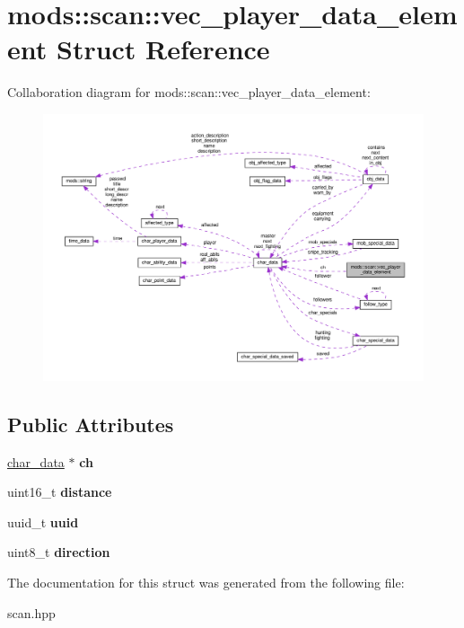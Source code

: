 \hypertarget{structmods_1_1scan_1_1vec__player__data__element}{}\section{mods\+:\+:scan\+:\+:vec\+\_\+player\+\_\+data\+\_\+element Struct Reference}
\label{structmods_1_1scan_1_1vec__player__data__element}


Collaboration diagram for mods\+:\+:scan\+:\+:vec\+\_\+player\+\_\+data\+\_\+element\+:
\nopagebreak
\begin{figure}[H]
\begin{center}
\leavevmode
\includegraphics[width=350pt]{structmods_1_1scan_1_1vec__player__data__element__coll__graph}
\end{center}
\end{figure}
\subsection*{Public Attributes}
\begin{DoxyCompactItemize}
\item 
\mbox{\label{structmods_1_1scan_1_1vec__player__data__element_a0c777572b74b2fa35af585d92483ebf6}} 
\hyperlink{structchar__data}{char\+\_\+data} $\ast$ {\bfseries ch}
\item 
\mbox{\label{structmods_1_1scan_1_1vec__player__data__element_ad17f50dc8c2fba5fe4071328826add3c}} 
uint16\+\_\+t {\bfseries distance}
\item 
\mbox{\label{structmods_1_1scan_1_1vec__player__data__element_abbb4c1a40d4298bb66ffa5271abf7cd4}} 
uuid\+\_\+t {\bfseries uuid}
\item 
\mbox{\label{structmods_1_1scan_1_1vec__player__data__element_a0fd083583c787294616cb513449a8524}} 
uint8\+\_\+t {\bfseries direction}
\end{DoxyCompactItemize}


The documentation for this struct was generated from the following file\+:\begin{DoxyCompactItemize}
\item 
scan.\+hpp\end{DoxyCompactItemize}
